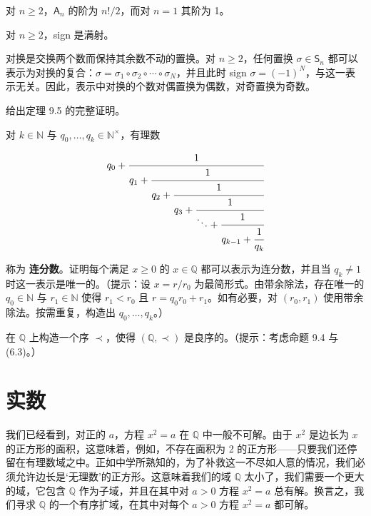 \begin{exercises}
\begin{items}
\item

对 $ n \geq 2 $，$ \mathsf{A}_n $ 的阶为 $ n!/2 $，而对 $ n = 1 $ 其阶为 1。

\item

对 $ n \geq 2 $，sign 是满射。

\item

对换是交换两个数而保持其余数不动的置换。对 $ n \geq 2 $，任何置换 $ \sigma \in \mathsf{S}_n $ 都可以表示为对换的复合：$ \sigma = \sigma_1 \circ \sigma_2 \circ \cdots \circ \sigma_N $，并且此时 sign $ \sigma = (-1)^N $，与这一表示无关。因此，表示中对换的个数对偶置换为偶数，对奇置换为奇数。

\end{items}

\item

给出定理 9.5 的完整证明。

\item

对 $ k \in \mathbb{N} $ 与 $ q_0, \ldots, q_k \in \mathbb{N}^\times $，有理数

\[
q_{0}+\cfrac{1}{q_{1}+\cfrac{1}{q_{2}+\cfrac{1}{q_{3}+\cfrac{1}{\ddots+\cfrac{1}{q_{k-1}+\cfrac{1}{q_{k}}}}}}}
\]

称为 \textbf{连分数}。证明每个满足 $ x \geq 0 $ 的 $ x \in \mathbb{Q} $ 都可以表示为连分数，并且当 $ q_k \neq 1 $ 时这一表示是唯一的。（提示：设 $ x = r/r_0 $ 为最简形式。由带余除法，存在唯一的 $ q_0 \in \mathbb{N} $ 与 $ r_1 \in \mathbb{N} $ 使得 $ r_1 < r_0 $ 且 $ r = q_0 r_0 + r_1 $。如有必要，对 $ (r_0, r_1) $ 使用带余除法。按需重复，构造出 $ q_0, \ldots, q_k $。）

\item

在 $ \mathbb{Q} $ 上构造一个序 $ \prec $，使得 $ (\mathbb{Q},\prec) $ 是良序的。（提示：考虑命题 9.4 与 (6.3)。）

\end{exercises}

\section{实数}

我们已经看到，对正的 $ a $，方程 $ x^2 = a $ 在 $ \mathbb{Q} $ 中一般不可解。由于 $ x^2 $ 是边长为 $ x $ 的正方形的面积，这意味着，例如，不存在面积为 2 的正方形——只要我们还停留在有理数域之中。正如中学所熟知的，为了补救这一不尽如人意的情况，我们必须允许边长是‘无理数’的正方形。这意味着我们的域 $ \mathbb{Q} $ 太小了，我们需要一个更大的域，它包含 $ \mathbb{Q} $ 作为子域，并且在其中对 $ a > 0 $ 方程 $ x^2 = a $ 总有解。换言之，我们寻求 $ \mathbb{Q} $ 的一个有序扩域，在其中对每个 $ a > 0 $ 方程 $ x^2 = a $ 都可解。

